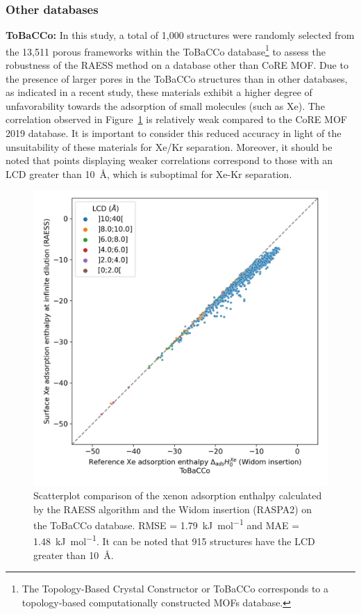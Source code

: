 \documentclass[main]{subfiles}
\begin{document}
\subsubsection{Other databases}\label{sct:other_database}

\textbf{ToBaCCo:}
In this study, a total of 1,000 structures were randomly selected from the 13,511 porous frameworks within the ToBaCCo database\footnote[1]{The Topology-Based Crystal Constructor or ToBaCCo corresponds to a topology-based computationally constructed MOFs database. } to assess the robustness of the RAESS method on a database other than CoRE MOF. Due to the presence of larger pores in the ToBaCCo structures than in other databases, as indicated in a recent study,\autocite{Moosavi_2020} these materials exhibit a higher degree of unfavorability towards the adsorption of small molecules (such as Xe). The correlation observed in Figure~\ref{fgr:tobacco} is relatively weak compared to the CoRE MOF 2019 database. It is important to consider this reduced accuracy in light of the unsuitability of these materials for Xe/Kr separation. Moreover, it should be noted that points displaying weaker correlations correspond to those with an LCD greater than \SI{10}{\angstrom}, which is suboptimal for Xe-Kr separation.

\begin{figure}[h!]
\centering
  \includegraphics[width=0.5\linewidth]{figures/3-fastsim/H_Xe_0_widom_vs_Enthalpy_surface_kjmol_overview_tobacco.jpeg}
  \caption{Scatterplot comparison of the xenon adsorption enthalpy calculated by the RAESS algorithm and the Widom insertion (RASPA2) on the ToBaCCo database. RMSE = \SI{1.79}{\kilo\joule\per\mole} and MAE = \SI{1.48}{\kilo\joule\per\mole}. It can be noted that 915 structures have the LCD greater than \SI{10}{\angstrom}.}\label{fgr:tobacco}
\end{figure}
\end{document}
